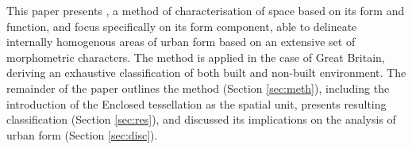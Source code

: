 This paper presents , a method of characterisation of space
based on its form and function, and focus specifically on its form component, able to
delineate internally homogenous areas of urban form based on an extensive set of
morphometric characters. The method is applied in the case of Great Britain, deriving an
exhaustive classification of both built and non-built environment. The remainder of the
paper outlines the method (Section \ref{sec:meth}), including the introduction of the
Enclosed tessellation as the spatial unit, presents resulting classification (Section
\ref{sec:res}), and discussed its implications on the analysis of urban form (Section
\ref{sec:disc}).